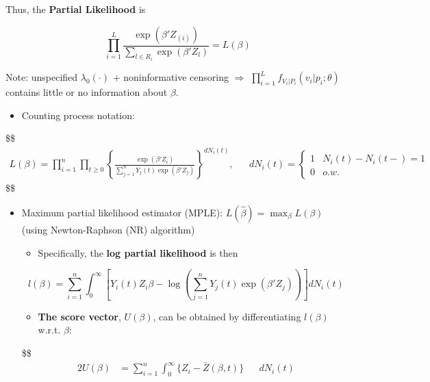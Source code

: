 \documentclass[
]{book}
\providecommand{\tightlist}{%
  \setlength{\itemsep}{0pt}\setlength{\parskip}{0pt}}
\begin{document}
{{{Thus, the \textbf{Partial Likelihood} is

\[
\prod^L_{i=1}\frac{\exp(\beta ' Z_{(i)})}{\sum\limits_{l\in R_i} \exp(\beta ' Z_{l})} = L(\beta)\tag{3}
\]

Note: unspecified \(\lambda_0(\cdot)\) + noninformative censoring \(\Rightarrow\) \(\prod\limits_{i=1}^L f_{V_i \big | P_i} (v_i \Big | p_i ; \theta)\) contains little or no information about \(\beta\).

\begin{itemize}
\tightlist
\item
  Counting process notation:
\end{itemize}

\$\$
\begin{align}
L(\beta) = \prod^n_{i=1}\prod_{t\ge0} \left \{ 

\frac{\exp(\beta ' Z_{i})}{\sum\limits_{j=1}^n Y_j(t) \exp(\beta ' Z_{j})}

\right\}^{dN_i(t)}


, && dN_i(t) = \begin{cases} 1 & N_i(t) - N_i {(t-)} =1\\0 & o.w.\end{cases}

\end{align}
\$\$

\begin{itemize}
\item
  Maximum partial likelihood estimator (MPLE): \(L( \hat \beta) = \max_\beta L(\beta)\) (using Newton-Raphson (NR) algorithm)

  \begin{itemize}
  \tightlist
  \item
    Specifically, the \textbf{log partial likelihood} is then
  \end{itemize}

  \[
  l(\beta) = \sum_{i=1}^n \int_0^\infty \left[ Y_i (t) Z_i \beta - \log\left( \sum_{j=1}^n Y_j(t) \exp(\beta ' Z_j ) \right) \right]dN_i(t)
  \]

  \begin{itemize}
  \tightlist
  \item
    \textbf{The score vector}, \(U(\beta)\), can be obtained by differentiating \(l(\beta)\) w.r.t. \(\beta\):
  \end{itemize}

  \$\$
  \begin{alignat}{2}
  U(\beta) &= \sum_{i=1}^n \int_0^\infty \Big \{ Z_i - \bar Z(\beta, t) \Big \}&&dN_i (t)


\end{alignat}
\end{itemize}}}}
\end{document}
